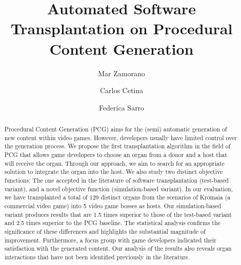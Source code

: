 \documentclass[sigconf,screen,review]{acmart}
\newcommand{\CaseStudy}{Kromaia}
\begin{document}
\title{Automated Software Transplantation on Procedural Content Generation}

\author{Mar Zamorano}

\author{Carlos Cetina}

\author{Federica Sarro}

\renewcommand{\shortauthors}{Zamorano et al.}

\begin{abstract}
Procedural Content Generation (PCG) aims for the (semi) automatic generation of new content within video games. However, developers usually have limited control over the generation process.
We propose the first transplantation algorithm in the field of PCG that allows game developers to choose an organ from a donor and a host that will receive the organ. Through our approach, we aim to search for an appropriate solution to integrate the organ into the host. We also study two distinct objective functions: The one accepted in the literature of  software transplantation (test-based variant), and a novel objective function (simulation-based variant).
In our evaluation, we have transplanted a total of 129 distinct organs from the scenarios of \CaseStudy{} (a commercial video game) into 5 video game bosses as hosts.
Our simulation-based variant produces results that are 1.5 times superior to those of the test-based variant and 2.5 times superior to the PCG baseline. The statistical analysis confirms the significance of these differences and highlights the substantial magnitude of improvement.
Furthermore, a focus group with game developers indicated their satisfaction with the generated content.
Our analysis of the results also reveals organ interactions that have not been  identified previously in the literature.
\end{abstract}

\end{document}
